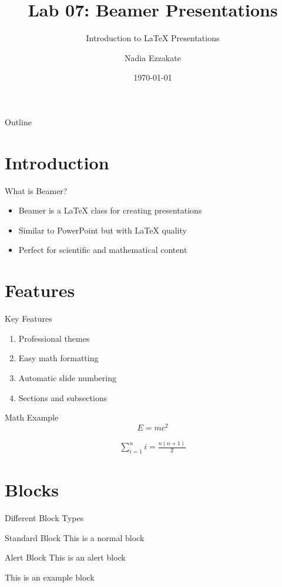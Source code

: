 \documentclass{beamer}
\title{Lab 07: Beamer Presentations}
\subtitle{Introduction to LaTeX Presentations}
\author{Nadia Ezzakate}
\institute{RUDN University}
\date{\today}
\begin{document}
\begin{frame}
\titlepage
\end{frame}

\begin{frame}{Outline}
\tableofcontents
\end{frame}

\section{Introduction}

\begin{frame}{What is Beamer?}
\begin{itemize}
  \item Beamer is a LaTeX class for creating presentations
  \item Similar to PowerPoint but with LaTeX quality
  \item Perfect for scientific and mathematical content
\end{itemize}
\end{frame}

\section{Features}

\begin{frame}{Key Features}
\begin{enumerate}
  \item Professional themes
  \item Easy math formatting
  \item Automatic slide numbering
  \item Sections and subsections
\end{enumerate}
\end{frame}

\begin{frame}{Math Example}
\begin{equation}
E = mc^2
\end{equation}

\begin{align}
\sum_{i=1}^{n} i = \frac{n(n+1)}{2}
\end{align}
\end{frame}

\section{Blocks}

\begin{frame}{Different Block Types}
\begin{block}{Standard Block}
This is a normal block
\end{block}

\begin{alertblock}{Alert Block}
This is an alert block
\end{alertblock}

\begin{examples}
This is an example block
\end{examples}
\end{frame}
\end{document}

